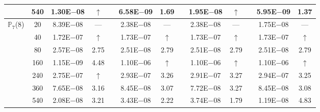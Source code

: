 \begin{table}[H]
{\begin{tabular}{@{}l c c c c c c c c c c c c@{}}
 & 540 & 1.30E$-$08 & $\uparrow$  &  & 6.58E$-$09 & 1.69 &  & 1.95E$-$08 & $\uparrow$ &  & 5.95E$-$09 & 1.37\\
\midrule
\multirow{7}{*}{$\mathbb{P}_{7}$(8)}
 & 20 & 8.39E$-$08 & ---  &  & 2.38E$-$08 & --- &  & 2.38E$-$08 & --- &  & 1.75E$-$08 & ---\\
 & 40 & 1.72E$-$07 & $\uparrow$  &  & 1.73E$-$07 & $\uparrow$ &  & 1.73E$-$07 & $\uparrow$ &  & 1.73E$-$07 & $\uparrow$\\
 & 80 & 2.57E$-$08 & 2.75  &  & 2.51E$-$08 & 2.79 &  & 2.51E$-$08 & 2.79 &  & 2.51E$-$08 & 2.79\\
 & 160 & 1.15E$-$09 & 4.48  &  & 1.10E$-$06 & $\uparrow$ &  & 1.10E$-$06 & $\uparrow$ &  & 1.10E$-$06 & $\uparrow$\\
 & 240 & 2.75E$-$07 & $\uparrow$  &  & 2.93E$-$07 & 3.26 &  & 2.91E$-$07 & 3.27 &  & 2.94E$-$07 & 3.25\\
 & 360 & 7.65E$-$08 & 3.16  &  & 8.45E$-$08 & 3.07 &  & 7.72E$-$08 & 3.27 &  & 8.45E$-$08 & 3.08\\
 & 540 & 2.08E$-$08 & 3.21  &  & 3.43E$-$08 & 2.22 &  & 3.74E$-$08 & 1.79 &  & 1.19E$-$08 & 4.83\\
\bottomrule
\end{tabular}}
\label{PRO:bending:01_23_glob2v2}
\end{table}
